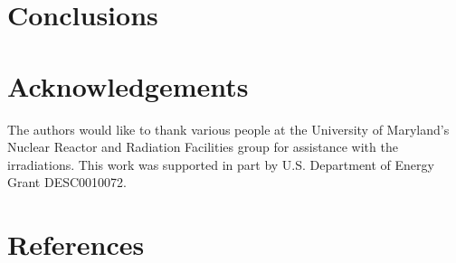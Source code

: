 \documentclass[review]{elsarticle}
\begin{document}
\section{Conclusions}

\section{Acknowledgements}
The authors would like to thank {\color{red} various people} at
the University of Maryland's Nuclear Reactor and Radiation
Facilities group for assistance
with the irradiations.
This work was supported in part by U.S. Department of Energy Grant DESC0010072.

\section*{References}


\end{document}
